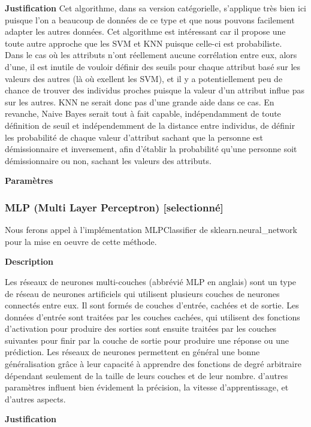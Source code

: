 \documentclass{ceri/sty/rapport}
\begin{document}
\textbf{Justification}
Cet algorithme, dans sa version catégorielle, s'applique très bien ici puisque l'on a beaucoup de données de ce type et que nous pouvons facilement adapter les autres données. Cet algorithme est intéressant car il propose une toute autre approche que les SVM et KNN puisque celle-ci est probabiliste.\\
Dans le cas où les attributs n'ont réellement aucune corrélation entre eux, alors d'une, il est inutile de vouloir définir des seuils pour chaque attribut basé sur les valeurs des autres (là où exellent les SVM), et il y a potentiellement peu de chance de trouver des individus proches puisque la valeur d'un attribut influe pas sur les autres. KNN ne serait donc pas d'une grande aide dans ce cas. En revanche, Naive Bayes serait tout à fait capable, indépendamment de toute définition de seuil et indépendemment de la distance entre individus, de définir les probabilité de chaque valeur d'attribut sachant que la personne est démissionnaire et inversement, afin d'établir la probabilité qu'une personne soit démissionnaire ou non, sachant les valeurs des attributs.

\textbf{Paramètres}


\subsubsection{MLP (Multi Layer Perceptron) [selectionné]}

Nous ferons appel à l'implémentation MLPClassifier de sklearn.neural\_network pour la mise en oeuvre de cette méthode.

\textbf{Description}

Les réseaux de neurones multi-couches (abbrévié MLP en anglais) sont un type de réseau de neurones artificiels qui utilisent plusieurs couches de neurones connectés entre eux. Il sont formés de couches d'entrée, cachées et de sortie. Les données d'entrée sont traitées par les couches cachées, qui utilisent des fonctions d'activation pour produire des sorties sont ensuite traitées par les couches suivantes pour finir par la couche de sortie pour produire une réponse ou une prédiction. Les réseaux de neurones permettent en général une bonne généralisation grâce à leur capacité à apprendre des fonctions de degré arbitraire dépendant seulement de la taille de leurs couches et de leur nombre. d'autres paramètres influent bien évidement la précision, la vitesse d'apprentissage, et d'autres aspects.

\textbf{Justification}
\end{document}
